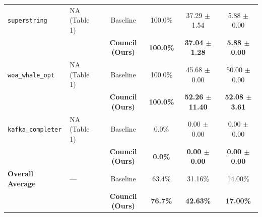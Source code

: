 \begin{table}[t]
\begin{tabular}{llcccc}
\midrule
\texttt{superstring} & NA (Table 1) & Baseline & 100.0\% & 37.29 $\pm$ 1.54 & 5.88 $\pm$ 0.00 \\
 & & \textbf{Council (Ours)} & \textbf{100.0\%} & \textbf{37.04 $\pm$ 1.28} & \textbf{5.88 $\pm$ 0.00} \\
\midrule
\texttt{woa\_whale\_opt} & NA (Table 1) & Baseline & 100.0\% & 45.68 $\pm$ 0.00 & 50.00 $\pm$ 0.00 \\
 & & \textbf{Council (Ours)} & \textbf{100.0\%} & \textbf{52.26 $\pm$ 11.40} & \textbf{52.08 $\pm$ 3.61} \\
\midrule
\texttt{kafka\_completer} & NA (Table 1) & Baseline & 0.0\% & 0.00 $\pm$ 0.00 & 0.00 $\pm$ 0.00 \\
 & & \textbf{Council (Ours)} & \textbf{0.0\%} & \textbf{0.00 $\pm$ 0.00} & \textbf{0.00 $\pm$ 0.00} \\
\midrule
\textbf{Overall Average} & --- & Baseline & 63.4\% & 31.16\% & 14.00\% \\
 & & \textbf{Council (Ours)} & \textbf{76.7\%} & \textbf{42.63\%} & \textbf{17.00\%} \\
\bottomrule
\end{tabular}
\end{table}
